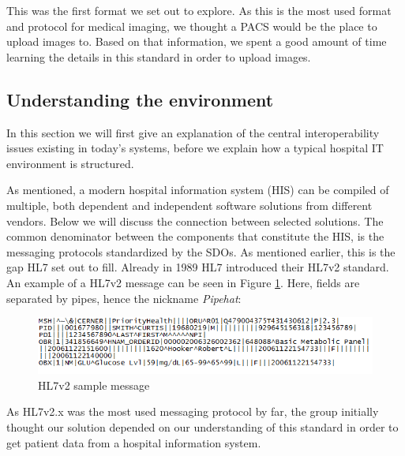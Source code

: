 This was the first format we set out to explore. As this is the most used format and protocol for medical imaging, we thought a PACS would be the place to upload images to. Based on that information, we spent a good amount of time learning the details in this standard in order to upload images.



\subsection{Understanding the environment}
\label{sec:understandingEnvironment}
In this section we will first give an explanation of the central interoperability issues existing in today's systems, before we explain how a typical hospital IT environment is structured.

As mentioned, a modern hospital information system (HIS) can be compiled of multiple, both dependent and independent software solutions from different vendors. Below we will discuss the connection between selected solutions.
\noindent
The common denominator between the components that constitute the HIS, is the messaging protocols standardized by the SDOs. As mentioned earlier, this is the gap HL7 set out to fill. Already in 1989 HL7 introduced their HL7v2 standard. An example of a HL7v2 message can be seen in Figure \ref{fig:hl7sample}. Here, fields are separated by pipes, hence the nickname \emph{Pipehat}:

\begin{figure}[H]
\centering
\includegraphics[scale=0.8]{img/hl7sample.png}
\caption{HL7v2 sample message}
\label{fig:hl7sample}
\end{figure}

\noindent
As HL7v2.x was the most used messaging protocol by far, the group initially thought our solution depended on our understanding of this standard in order to get patient data from a hospital information system.

